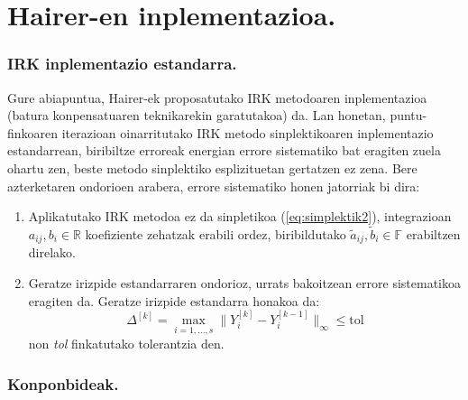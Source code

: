 \section{Hairer-en inplementazioa.}

\subsubsection*{IRK inplementazio estandarra.}

Gure abiapuntua, Hairer-ek \cite{Hairer2008} proposatutako IRK metodoaren inplementazioa (batura konpensatuaren teknikarekin \cite{Higham2002} garatutakoa) da.  
Lan honetan, puntu-finkoaren iterazioan oinarritutako IRK metodo sinplektikoaren  inplementazio estandarrean, biribiltze erroreak energian errore sistematiko bat eragiten zuela ohartu zen, beste metodo sinplektiko esplizituetan gertatzen ez zena. Bere azterketaren ondorioen arabera, errore sistematiko honen jatorriak bi dira:

\begin{enumerate}
 \item Aplikatutako IRK metodoa ez da sinpletikoa (\ref{eq:simplektik2}), integrazioan $a_{ij}, b_i \in \mathbb{R}$ koefiziente zehatzak erabili ordez, biribildutako $\tilde a_{ij},\tilde b_i \in \mathbb{F}$ erabiltzen direlako. 
\item Geratze irizpide estandarraren ondorioz, urrats bakoitzean errore sistematikoa eragiten da. Geratze irizpide estandarra honakoa da: 
\begin{equation}
\Delta ^{[k]} = \max_{i=1,\dots,s}\|Y_i^{[k]}-Y_i^{[k-1]}\|_{\infty} \leqslant \text{tol}
\end{equation}
non \emph{tol} finkatutako tolerantzia den.

\end{enumerate}    

\subsubsection*{Konponbideak.}

